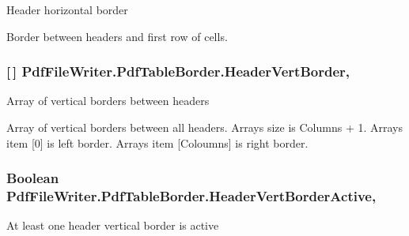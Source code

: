 Header horizontal border 

Border between headers and first row of cells. 
\subsubsection[{\texorpdfstring{Header\+Vert\+Border}{HeaderVertBorder}}]{ \mbox{[}$\,$\mbox{]} Pdf\+File\+Writer.\+Pdf\+Table\+Border.\+Header\+Vert\+Border\hspace{0.3cm}{\ttfamily [get]}, {\ttfamily [set]}}\hypertarget{class_pdf_file_writer_1_1_pdf_table_border_aacb1240350d31161b0a105488584870f}{}\label{class_pdf_file_writer_1_1_pdf_table_border_aacb1240350d31161b0a105488584870f}


Array of vertical borders between headers 

Array of vertical borders between all headers. Array\textquotesingle{}s size is Columns + 1. Array\textquotesingle{}s item \mbox{[}0\mbox{]} is left border. Array\textquotesingle{}s item \mbox{[}Coloumns\mbox{]} is right border. 
\subsubsection[{\texorpdfstring{Header\+Vert\+Border\+Active}{HeaderVertBorderActive}}]{\setlength{\rightskip}{0pt plus 5cm}Boolean Pdf\+File\+Writer.\+Pdf\+Table\+Border.\+Header\+Vert\+Border\+Active\hspace{0.3cm}{\ttfamily [get]}, {\ttfamily [set]}}\hypertarget{class_pdf_file_writer_1_1_pdf_table_border_aef93e4a5c88ed9c159c68e9d326d5648}{}\label{class_pdf_file_writer_1_1_pdf_table_border_aef93e4a5c88ed9c159c68e9d326d5648}


At least one header vertical border is active 


